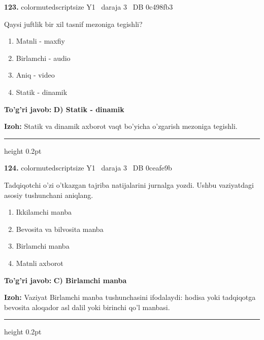 \documentclass[10pt,a4paper,oneside]{article}
\begin{document}
\noindent\textbf{\color{ink}123.}  {color{muted}scriptsize Y1 \textbullet\ daraja 3 \textbullet\ DB 0c498fb3}
\par
Qaysi juftlik bir xil tasnif mezoniga tegishli?
\begin{enumerate}[label=\Alph*),leftmargin=9mm]
\item Matnli - maxfiy
\item Birlamchi - audio
\item Aniq - video
\item Statik - dinamik
\end{enumerate}
\begin{tcolorbox}[enhanced,breakable,colback=teal!4,colframe=teal!50!black,boxrule=0.5pt,arc=1.1mm,left=3mm,right=3mm,top=1.7mm,bottom=1.7mm,before skip=2mm,after skip=2mm]
\textbf{\color{teal}To'g'ri javob:} \textbf{D) Statik - dinamik}
\par\smallskip
\textbf{Izoh:} Statik va dinamik axborot vaqt bo'yicha o'zgarish mezoniga tegishli.
\end{tcolorbox}
\vspace{2mm}\hrule height 0.2pt \vspace{3mm}

\noindent\textbf{\color{ink}124.}  {color{muted}scriptsize Y1 \textbullet\ daraja 3 \textbullet\ DB 0ceafe9b}
\par
Tadqiqotchi o'zi o'tkazgan tajriba natijalarini jurnalga yozdi. Ushbu vaziyatdagi asosiy tushunchani aniqlang.
\begin{enumerate}[label=\Alph*),leftmargin=9mm]
\item Ikkilamchi manba
\item Bevosita va bilvosita manba
\item Birlamchi manba
\item Matnli axborot
\end{enumerate}
\begin{tcolorbox}[enhanced,breakable,colback=teal!4,colframe=teal!50!black,boxrule=0.5pt,arc=1.1mm,left=3mm,right=3mm,top=1.7mm,bottom=1.7mm,before skip=2mm,after skip=2mm]
\textbf{\color{teal}To'g'ri javob:} \textbf{C) Birlamchi manba}
\par\smallskip
\textbf{Izoh:} Vaziyat Birlamchi manba tushunchasini ifodalaydi: hodisa yoki tadqiqotga bevosita aloqador asl dalil yoki birinchi qo'l manbasi.
\end{tcolorbox}
\vspace{2mm}\hrule height 0.2pt \vspace{3mm}
\end{document}
